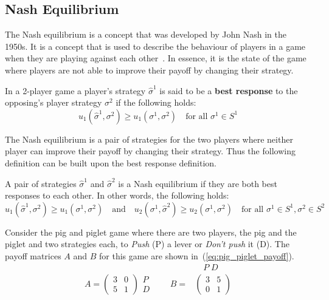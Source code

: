 \subsection{Nash Equilibrium}

The Nash equilibrium is a concept that was developed by John Nash in the
1950s.
It is a concept that is used to describe the behaviour of players in a
game when they are playing against each other~\cite{kreps1989nash}.
In essence, it is the state of the game where players are not able to improve
their payoff by changing their strategy.

\begin{definition}
In a 2-player game a player's strategy \(\hat{\sigma}^1\) is said to be a
\textbf{best response} to the opposing's player strategy \(\sigma^2\) if the
following holds:
\begin{equation}\label{eq:best_response}
    u_1(\hat{\sigma}^1,\sigma^2) \geq u_1(\sigma^1,\sigma^2) \quad
    \text{for all } \sigma^1 \in S^1
\end{equation}
\end{definition}

The Nash equilibrium is a pair of strategies for the two players where neither
player can improve their payoff by changing their strategy.
Thus the following definition can be built upon the best response definition.

\begin{definition}
A pair of strategies \(\hat{\sigma}^1\) and \(\hat{\sigma}^2\) is a Nash
equilibrium if they are both best responses to each other.
In other words, the following holds:
\begin{equation}\label{eq:nash_equilibrium}
    u_1(\hat{\sigma}^1,\sigma^2) \geq u_1(\sigma^1,\sigma^2)
    \quad \text{and} \quad
    u_2(\sigma^1, \hat{\sigma}^2) \geq u_2(\sigma^1,\sigma^2)
    \quad \text{for all } \sigma^1 \in S^1, \sigma^2 \in S^2
\end{equation}
\end{definition}

Consider the pig and piglet game where there are two players, the pig and the
piglet and two strategies each, to \textit{Push} (P) a lever or
\textit{Don't push} it (D).
The payoff matrices \(A\) and \(B\) for this game are shown
in~(\ref{eq:pig_piglet_payoff}).
\begin{align}
    & \quad P \; D \nonumber \\
    A =
    \begin{pmatrix}
        3 & 0 \\
        5 & 1
    \end{pmatrix}
    \begin{matrix}
        P \\
        D
    \end{matrix} \qquad
    B =&
    \begin{pmatrix}
        3 & 5 \\
        0 & 1
    \end{pmatrix}
    \label{eq:pig_piglet_payoff}
\end{align}

